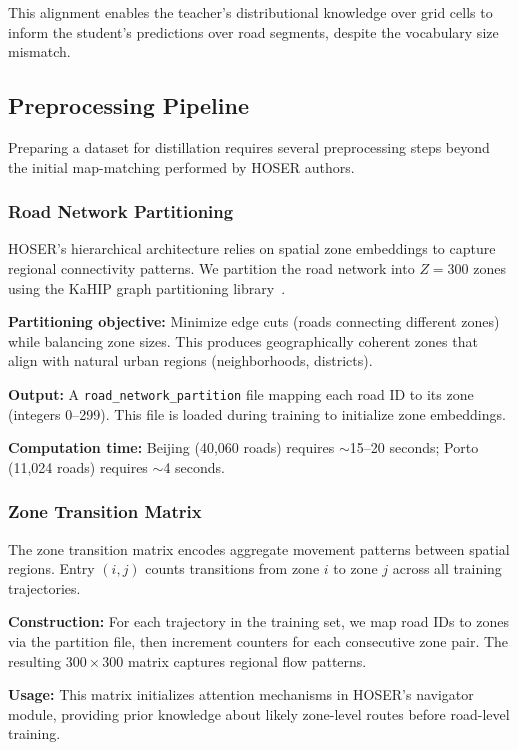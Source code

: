 This alignment enables the teacher's distributional knowledge over grid cells to inform the student's predictions over road segments, despite the vocabulary size mismatch.

\subsection{Preprocessing Pipeline}
\label{sec:data-pipeline}

Preparing a dataset for distillation requires several preprocessing steps beyond the initial map-matching performed by HOSER authors.

\subsubsection{Road Network Partitioning}

HOSER's hierarchical architecture relies on spatial zone embeddings to capture regional connectivity patterns. We partition the road network into $Z = 300$ zones using the KaHIP graph partitioning library~\cite{sandersEngineeringMultilevelGraph2011}.

\textbf{Partitioning objective:} Minimize edge cuts (roads connecting different zones) while balancing zone sizes. This produces geographically coherent zones that align with natural urban regions (neighborhoods, districts).

\textbf{Output:} A \texttt{road\_network\_partition} file mapping each road ID to its zone (integers 0--299). This file is loaded during training to initialize zone embeddings.

\textbf{Computation time:} Beijing (40,060 roads) requires $\sim$15--20 seconds; Porto (11,024 roads) requires $\sim$4 seconds.

\subsubsection{Zone Transition Matrix}

The zone transition matrix encodes aggregate movement patterns between spatial regions. Entry $(i, j)$ counts transitions from zone $i$ to zone $j$ across all training trajectories.

\textbf{Construction:} For each trajectory in the training set, we map road IDs to zones via the partition file, then increment counters for each consecutive zone pair. The resulting $300 \times 300$ matrix captures regional flow patterns.

\textbf{Usage:} This matrix initializes attention mechanisms in HOSER's navigator module, providing prior knowledge about likely zone-level routes before road-level training.

